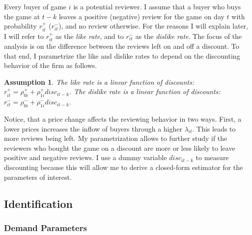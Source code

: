 \documentclass[
  12pt,
  pagebackref]{article}
\newtheorem{assumption}{Assumption}[section]
\begin{document}
Every buyer of game \(i\) is a potential reviewer. I assume that a buyer
who buys the game at \(t-k\) leaves a positive (negative) review for the
game on day \(t\) with probability \(r_{it}^+\) (\(r_{it}^-\)), and no
review otherwise. For the reasons I will explain later, I will refer to
\(r_{it}^+\) as the \emph{like rate}, and to \(r_{it}^-\) as the
\emph{dislike rate}. The focus of the analysis is on the difference
between the reviews left on and off a discount. To that end, I
parametrize the like and dislike rates to depend on the discounting
behavior of the firm as follows.

\begin{assumption}\label{likeDiscountAss}
The like rate is a linear function of discounts:
$r_{it}^+ = \rho_{0i}^+ + \rho_{1i}^+ disc_{it-k}$.  The dislike rate is a linear function of discounts: $r_{it}^- = \rho_{0i}^- + \rho_{1i}^- disc_{it-k}$.
\end{assumption}

\noindent Notice, that a price change affects the reviewing behavior in
two ways. First, a lower prices increases the inflow of buyers through a
higher \(\lambda_{it}\). This leads to more reviews being left. My
parametrization allows to further study if the reviewers who bought the
game on a discount are more or less likely to leave positive and
negative reviews. I use a dummy variable \(disc_{it-k}\) to measure
discounting because this will allow me to derive a closed-form estimator
for the parameters of interest.

\hypertarget{identification}{%
\subsection{Identification}\label{identification}}

\hypertarget{demand-parameters}{%
\subsubsection{Demand Parameters}\label{demand-parameters}}
\end{document}
